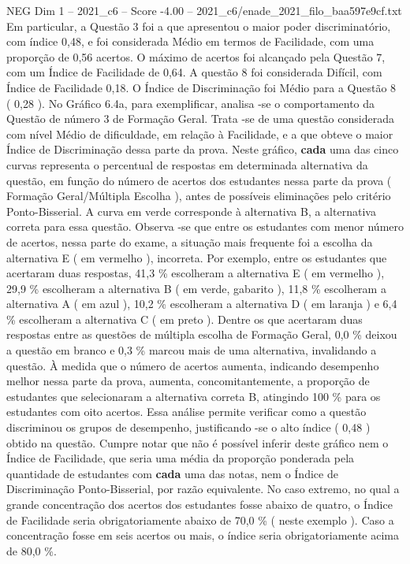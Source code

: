\begin{textsample}{NEG Dim 1 – 2021\_c6 – Score -4.00 – 2021\_c6/enade\_2021\_filo\_baa597e9cf.txt}
Em particular, a Questão 3 foi a que apresentou o maior poder discriminatório, com índice 0,48, e foi considerada Médio em termos de Facilidade, com uma proporção de 0,56 acertos.
O máximo de acertos foi alcançado pela Questão 7, com um Índice de Facilidade de 0,64.
A questão 8 foi considerada Difícil, com Índice de Facilidade 0,18.
O Índice de Discriminação foi Médio para a Questão 8 ( 0,28 ).
No Gráfico 6.4a, para exemplificar, analisa -se o comportamento da Questão de número 3 de Formação Geral.
Trata -se de uma questão considerada com nível Médio de dificuldade, em relação à Facilidade, e a que obteve o maior Índice de Discriminação dessa parte da prova.
Neste gráfico, \textbf{cada} uma das cinco curvas representa o percentual de respostas em determinada alternativa da questão, em função do número de acertos dos estudantes nessa parte da prova ( Formação Geral/Múltipla Escolha ), antes de possíveis eliminações pelo critério Ponto-Bisserial.
A curva em verde corresponde à alternativa B, a alternativa correta para essa questão.
Observa -se que entre os estudantes com menor número de acertos, nessa parte do exame, a situação mais frequente foi a escolha da alternativa E ( em vermelho ), incorreta.
Por exemplo, entre os estudantes que acertaram duas respostas, 41,3 \% escolheram a alternativa E ( em vermelho ), 29,9 \% escolheram a alternativa B ( em verde, gabarito ), 11,8 \% escolheram a alternativa A ( em azul ), 10,2 \% escolheram a alternativa D ( em laranja ) e 6,4 \% escolheram a alternativa C ( em preto ).
Dentre os que acertaram duas respostas entre as questões de múltipla escolha de Formação Geral, 0,0 \% deixou a questão em branco e 0,3 \% marcou mais de uma alternativa, invalidando a questão.
À medida que o número de acertos aumenta, indicando desempenho melhor nessa parte da prova, aumenta, concomitantemente, a proporção de estudantes que selecionaram a alternativa correta B, atingindo 100 \% para os estudantes com oito acertos.
Essa análise permite verificar como a questão discriminou os grupos de desempenho, justificando -se o alto índice ( 0,48 ) obtido na questão.
Cumpre notar que não é possível inferir deste gráfico nem o Índice de Facilidade, que seria uma média da proporção ponderada pela quantidade de estudantes com \textbf{cada} uma das notas, nem o Índice de Discriminação Ponto-Bisserial, por razão equivalente.
No caso extremo, no qual a grande concentração dos acertos dos estudantes fosse abaixo de quatro, o Índice de Facilidade seria obrigatoriamente abaixo de 70,0 \% ( neste exemplo ).
Caso a concentração fosse em seis acertos ou mais, o índice seria obrigatoriamente acima de 80,0 \%.

\end{textsample}
